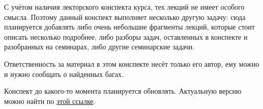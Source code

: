 С учётом наличия лекторского конспекта курса, тех лекций не имеет особого смысла. Поэтому данный конспект выполняет несколько другую задачу: сюда планируется добавлять либо очень небольшие фрагменты лекций, которые стоит описать несколько подробнее, либо разборы задач, оставленных в конспекте и разобранных на семинарах, либо другие семинарские задачи.

Ответственность за материал в этом конспекте несёт только его автор, ему можно и нужно сообщать о найденных багах.

Конспект до какого-то момента планируется обновлять. Актуальную версию можно найти по \href{https://github.com/zenkovev/Random-processes}{этой ссылке}.